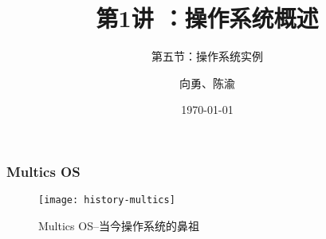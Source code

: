 


\title[第1讲]{第1讲 ：操作系统概述} %
\subtitle{第五节：操作系统实例}
\author{向勇、陈渝} %
\date{\today} %



\begin{frame}
\titlepage %
\end{frame}

%
%

\begin{frame}
	\frametitle{Multics OS}
	
	\begin{figure}
		\centering
		\texttt{[image: history-multics]}
		\caption{Multics OS--当今操作系统的鼻祖}
	\end{figure}
	
\end{frame}

